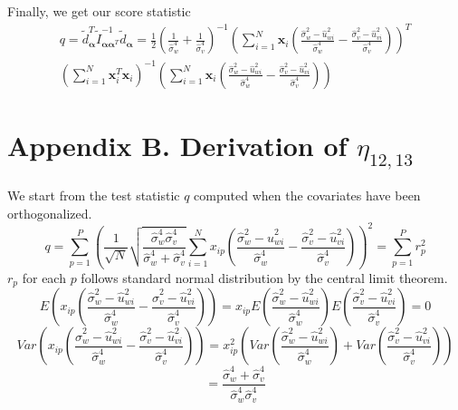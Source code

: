 \documentclass[aap, preprint]{imsart}
\numberwithin{equation}{section}
\theoremstyle{plain}
\begin{document}
Finally, we get our score statistic
\begin{equation}
    \begin{multlined}
    q = \tilde{d}_{\bm{\alpha}}^T \tilde{I}_{\bm{\alpha}\bm{\alpha}^T}^{-1}
    \tilde{d}_{\bm{\alpha}}
    =\frac{1}{2}\left( \frac{1}{\hat{\sigma}_w^4}+\frac{1}{\hat{\sigma}_v^4}\right)^{-1}
\left(\sum_{i=1}^{N} \bm{x}_{i} 
\left(
\frac{\hat{\sigma}_w^2-\hat{u}_{wi}^2}{\hat{\sigma}_w^4}- \frac{\hat{\sigma}_v^2-\hat{u}_{vi}^2}{\hat{\sigma}_v^4}
\right)
\right)^T \\
\left( \sum_{i=1}^{N} \bm{x}_i^T \bm{x}_i \right)^{-1}
\left(
\sum_{i=1}^{N} \bm{x}_{i} 
\left(
\frac{\hat{\sigma}_w^2-\hat{u}_{wi}^2}{\hat{\sigma}_w^4}- \frac{\hat{\sigma}_v^2-\hat{u}_{vi}^2}{\hat{\sigma}_v^4}
\right)
\right)
    \end{multlined}
\end{equation}


\section*{Appendix B. Derivation of $\eta_{12,13}$}
We start from the test statistic $q$ computed when the covariates have been orthogonalized.
$$q = \sum_{p=1}^{P}
 \left(\frac{1}{\sqrt{N}}
 \sqrt{\frac{\hat{\sigma}_w^4 \hat{\sigma}_v^4}{\hat{\sigma}_w^4 + \hat{\sigma}_v^4}}
 \sum_{i=1}^{N} x_{ip} \left( \frac{\hat{\sigma}_w^2 - \hat{u}_{wi}^2}{\hat{\sigma}_w^4}
 - \frac{\hat{\sigma}_v^2 - \hat{u}_{vi}^2}{\hat{\sigma}_v^4}
 \right)
\right)^2 = \sum_{p=1}^{P}r_p^2$$
$r_p$ for each $p$ follows standard normal distribution by the central limit theorem. 
$$E\left(x_{ip}\left( \frac{\hat{\sigma}_w^2 - \hat{u}_{wi}^2}{\hat{\sigma}_w^4}
 - \frac{\hat{\sigma}_v^2 - \hat{u}_{vi}^2}{\hat{\sigma}_v^4}
 \right)\right) = x_{ip} E\left( \frac{\hat{\sigma}_w^2 - \hat{u}_{wi}^2}{\hat{\sigma}_w^4} \right) E\left( \frac{\hat{\sigma}_v^2 - \hat{u}_{vi}^2}{\hat{\sigma}_v^4}
 \right) = 0$$
$$Var\left(x_{ip}\left( \frac{\hat{\sigma}_w^2 - \hat{u}_{wi}^2}{\hat{\sigma}_w^4}
- \frac{\hat{\sigma}_v^2 - \hat{u}_{vi}^2}{\hat{\sigma}_v^4}
\right)\right) = 
x_{ip}^2 \left( Var\left( \frac{\hat{\sigma}_w^2 - \hat{u}_{wi}^2}{\hat{\sigma}_w^4} \right)  + Var\left( \frac{\hat{\sigma}_v^2 - \hat{u}_{vi}^2}{\hat{\sigma}_v^4}\right)\right)$$
 $$ = \frac{\hat{\sigma}_w^4 + \hat{\sigma}_v^4}{\hat{\sigma}_w^4 \hat{\sigma}_v^4}$$
\end{document}
